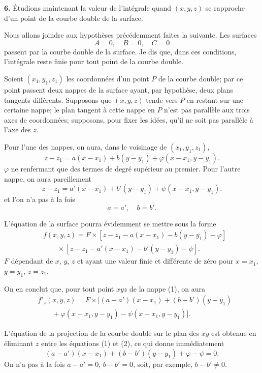\documentclass{article}
\begin{document}
\textbf{6.} Étudions maintenant la valeur de l'intégrale quand $(x, y, z)$ se rapproche d'un point de la courbe double de la surface.

Nous allons joindre aux hypothèses précédemment faites la suivante. Les surfaces
\[
A = 0, \quad B = 0, \quad C = 0
\]
passent par la courbe double de la surface. Je dis que, dans ces conditions, l'intégrale reste finie pour tout point de la courbe double.

Soient $(x_{1}, y_{1}, z_{1})$ les coordonnées d'un point $P$ de la courbe double; par ce point passent deux nappes de la surface ayant, par hypothèse, deux plans tangents différents. Supposons que $(x, y, z)$ tende vers $P$ en restant sur une certaine nappe; le plan tangent à cette nappe en $P$ n'est pas parallèle aux trois axes de coordonnées; supposons, pour fixer les idées, qu'il ne soit pas parallèle à l'axe des $z$.

Pour l'une des nappes, on aura, dans le voisinage de $(x_{1}, y_{1}, z_{1})$,
\[
z - z_{1} = a(x - x_{1}) + b(y - y_{1}) + \varphi(x - x_{1}, y - y_{1}). \tag{1}
\]
$\varphi$ ne renfermant que des termes de degré supérieur au premier.
Pour l'autre nappe, on aura pareillement
\[
z - z_{1} = a'(x - x_{1}) + b'(y - y_{1}) + \psi(x - x_{1}, y - y_{1}). \tag{2}
\]
et l'on n'a pas à la fois
\[
a = a', \quad b = b'.
\]

L'équation de la surface pourra évidemment se mettre sous la forme
\[
\begin{aligned}
&f(x, y, z) = F \times [z - z_{1} - a(x - x_{1}) - b(y - y_{1}) - \varphi] \\
&\qquad \times [z - z_{1} - a'(x - x_{1}) - b'(y - y_{1}) - \psi].
\end{aligned}
\]
$F$ dépendant de $x$, $y$, $z$ et ayant une valeur finie et différente de zéro pour $x = x_{1}$, $y = y_{1}$, $z = z_{1}$.

On en conclut que, pour tout point $xyz$ de la nappe (1), on aura
\[
\begin{aligned}
&f'_{z}(x, y, z) = F \times [(a - a')(x - x_{1}) + (b - b')(y - y_{1}) \\
&\qquad + \varphi(x - x_{1}, y - y_{1}) - \psi(x - x_{1}, y - y_{1})].
\end{aligned}
\]

L'équation de la projection de la courbe double sur le plan des $xy$ est obtenue en éliminant $z$ entre les équations (1) et (2), ce qui donne immédiatement
\[
(a - a')(x - x_{1}) + (b - b')(y - y_{1}) + \varphi - \psi = 0. \tag{3}
\]
On n'a pas à la fois $a - a' = 0$, $b - b' = 0$, soit, par exemple, $b - b' \neq 0$.
\end{document}
